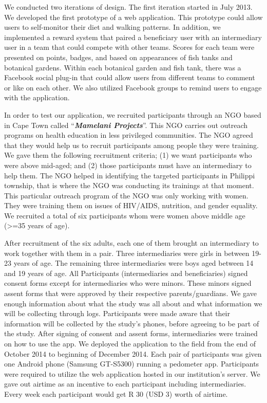 \documentclass{sig-alternate}
\begin{document}
We conducted two iterations of design. The first iteration started in July
2013. We developed the first prototype of a web application. This prototype
could allow users to self-monitor their diet and walking patterns. In
addition, we implemented a reward system that paired a beneficiary user with
an intermediary user in a team that could compete with other teams. Scores for
each team were presented on points, badges, and based on appearances of fish
tanks and botanical gardens. Within each botanical garden and fish tank, there
was a Facebook social plug-in that could allow users from different teams to
comment or like on each other. We also utilized Facebook groups to remind
users to engage with the application.

In order to test our application, we recruited participants through an NGO
based in Cape Town called ``\textbf{\textit{Mamelani Projects}}''. This NGO
carries out outreach programs on health education in less privileged
communities. The NGO agreed that they would help us to recruit participants
among people they were training. We gave them the following recruitment
criteria; (1) we want participants who were above mid-aged; and (2) those
participants must have an intermediary to help them. The NGO helped in
identifying the targeted participants in Philippi township, that is where the
NGO was conducting its trainings at that moment. This particular outreach
program of the NGO was only working with women. They were training them on
issues of HIV/AIDS, nutrition, and gender equality. We recruited a total of
six participants whom were women above middle age (>=35 years of age).

After recruitment of the six adults, each one of them brought an intermediary
to work together with them in a pair. Three intermediaries were girls in
between 19-23 years of age. The remaining three intermediaries were boys aged
between 14 and 19 years of age. All Participants (intermediaries and
beneficiaries) signed consent forms except for intermediaries who were minors.
These minors  signed assent forms that were approved by their respective
parents/guardians. We gave enough information about what the study was all
about and what information we will be collecting through logs. Participants
were made aware that their information will be collected by the study's
phones, before agreeing to be part of the study. After signing of consent and
assent forms, intermediaries were trained on how to use the app. We deployed
the application to the field from the end of October 2014 to beginning of
December 2014. Each pair of participants was given one Android phone (Samsung
GT-S5300) running a pedometer app. Participants were required to utilize the
web application hosted in our institution's server. We gave out  airtime as an
incentive to each participant including intermediaries. Every week each
participant would get R 30 (USD 3) worth of airtime.
\end{document}
